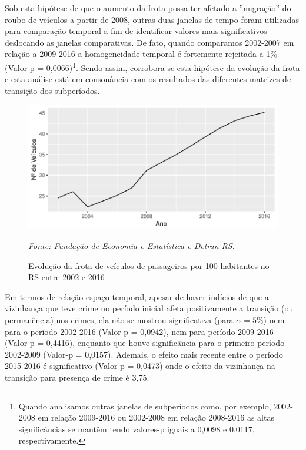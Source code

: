 \documentclass[12pt,openright,oneside,a4paper,english,french,spanish]{abntex2}
\numberwithin{table}{section} %
\numberwithin{figure}{section} %
\newcommand{\source}[1]{\textit{#1}}
\begin{document}
Sob esta hipótese de que o aumento da frota possa ter afetado a ''migração'' do roubo de veículos a partir de 2008, outras duas janelas de tempo foram utilizadas para comparação temporal a fim de identificar valores mais significativos deslocando as janelas comparativas. De fato, quando comparamos 2002-2007 em relação a 2009-2016 a homogeneidade temporal é fortemente rejeitada a 1\% (Valor-p = 0,0066)\footnote{Quando analisamos outras janelas de subperíodos como, por exemplo, 2002-2008 em relação 2009-2016 ou 2002-2008 em relação 2008-2016 as altas significâncias se mantêm tendo valores-p iguais a 0,0098 e 0,0117, respectivamente.}. Sendo assim, corrobora-se esta hipótese da evolução da frota e esta análise está em consonância com os resultados das diferentes matrizes de transição dos subperíodos.

\begin{figure}[H]
\begin{center}
\includegraphics{TESE_DE_DOUTORADO_RENAN_FINAL-evo_frota}
\end{center}
\caption{Evolução da frota de veículos de passageiros por 100 habitantes no RS entre 2002 e 2016}
\source{Fonte: Fundação de Economia e Estatística e Detran-RS.}
\label{fig:evolu_frota_2002_2016}
\end{figure}


Em termos de relação espaço-temporal, apesar de haver indícios de que a vizinhança que teve crime no período inicial afeta positivamente a transição (ou permanência) nos crimes, ela não se mostrou significativa (para $\alpha = 5\%$) nem para o período 2002-2016 (Valor-p = 0,0942), nem para período 2009-2016 (Valor-p = 0,4416), enquanto que houve significância para o primeiro período 2002-2009 (Valor-p = 0,0157). Ademais, o efeito mais recente entre o período 2015-2016 é significativo (Valor-p = 0,0473) onde o efeito da vizinhança na transição para presença de crime é 3,75.
\end{document}
